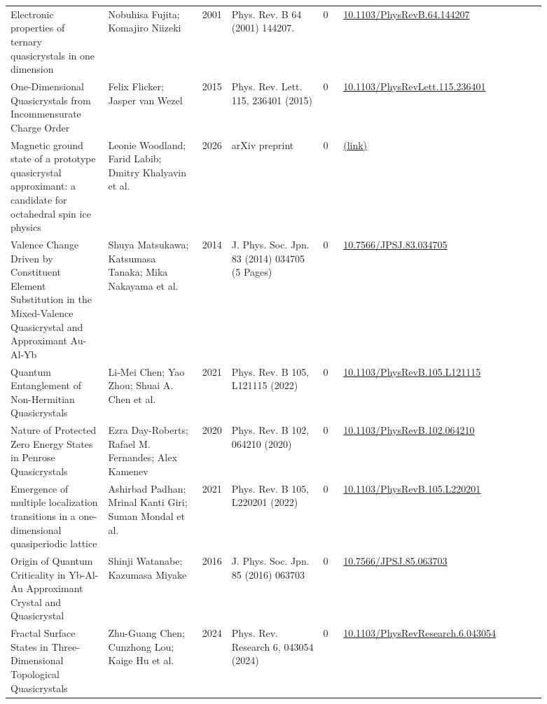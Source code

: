 \documentclass[10pt,a4paper]{article}
\begin{document}
{\begin{longtable}{p{0.192\linewidth}p{0.192\linewidth}p{0.043\linewidth}p{0.192\linewidth}p{0.043\linewidth}p{0.132\linewidth}p{0.096\linewidth}}
Electronic properties of ternary quasicrystals in one dimension & Nobuhisa Fujita; Komajiro Niizeki & 2001 & Phys. Rev. B 64 (2001) 144207. & 0 & \href{https://doi.org/10.1103/PhysRevB.64.144207}{10.1103/PhysRevB.64.144207} &  \\
One-Dimensional Quasicrystals from Incommensurate Charge Order & Felix Flicker; Jasper van Wezel & 2015 & Phys. Rev. Lett. 115, 236401 (2015) & 0 & \href{https://doi.org/10.1103/PhysRevLett.115.236401}{10.1103/PhysRevLett.115.236401} &  \\
Magnetic ground state of a prototype quasicrystal approximant: a candidate for octahedral spin ice physics & Leonie Woodland; Farid Labib; Dmitry Khalyavin et al. & 2026 & arXiv preprint & 0 & \href{http://arxiv.org/abs/2605.26044v1}{(link)} &  \\
Valence Change Driven by Constituent Element Substitution in the Mixed-Valence Quasicrystal and Approximant Au-Al-Yb & Shuya Matsukawa; Katsumasa Tanaka; Mika Nakayama et al. & 2014 & J. Phys. Soc. Jpn. 83 (2014) 034705 (5 Pages) & 0 & \href{https://doi.org/10.7566/JPSJ.83.034705}{10.7566/JPSJ.83.034705} &  \\
Quantum Entanglement of Non-Hermitian Quasicrystals & Li-Mei Chen; Yao Zhou; Shuai A. Chen et al. & 2021 & Phys. Rev. B 105, L121115 (2022) & 0 & \href{https://doi.org/10.1103/PhysRevB.105.L121115}{10.1103/PhysRevB.105.L121115} &  \\
Nature of Protected Zero Energy States in Penrose Quasicrystals & Ezra Day-Roberts; Rafael M. Fernandes; Alex Kamenev & 2020 & Phys. Rev. B 102, 064210 (2020) & 0 & \href{https://doi.org/10.1103/PhysRevB.102.064210}{10.1103/PhysRevB.102.064210} &  \\
Emergence of multiple localization transitions in a one-dimensional quasiperiodic lattice & Ashirbad Padhan; Mrinal Kanti Giri; Suman Mondal et al. & 2021 & Phys. Rev. B 105, L220201 (2022) & 0 & \href{https://doi.org/10.1103/PhysRevB.105.L220201}{10.1103/PhysRevB.105.L220201} &  \\
Origin of Quantum Criticality in Yb-Al-Au Approximant Crystal and Quasicrystal & Shinji Watanabe; Kazumasa Miyake & 2016 & J. Phys. Soc. Jpn. 85 (2016) 063703 & 0 & \href{https://doi.org/10.7566/JPSJ.85.063703}{10.7566/JPSJ.85.063703} &  \\
Fractal Surface States in Three-Dimensional Topological Quasicrystals & Zhu-Guang Chen; Cunzhong Lou; Kaige Hu et al. & 2024 & Phys. Rev. Research 6, 043054 (2024) & 0 & \href{https://doi.org/10.1103/PhysRevResearch.6.043054}{10.1103/PhysRevResearch.6.043054} &  \\

\end{longtable}}
\end{document}

